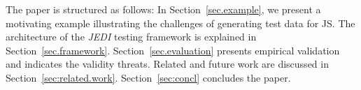 The paper is structured as follows: In Section~\ref{sec.example}, we present a motivating example illustrating the challenges of generating test data for JS. The architecture of the \emph{JEDI} testing framework is explained in Section~\ref{sec.framework}. Section~\ref{sec.evaluation} presents empirical validation and indicates the validity threats. Related and future work are discussed in Section~\ref{sec:related.work}. Section~\ref{sec:concl} concludes the paper.

